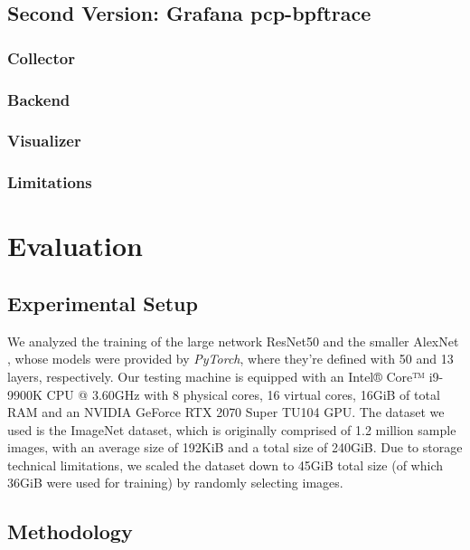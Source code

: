 \documentclass[conference]{IEEEtran}
\begin{document}
\subsection{Second Version: Grafana pcp-bpftrace}

\subsubsection{Collector}

\subsubsection{Backend}

\subsubsection{Visualizer}

\subsubsection{Limitations}

\section{Evaluation}

\subsection{Experimental Setup}

We analyzed the training of the large network ResNet50 \cite{resnet50} and the smaller AlexNet \cite{alexnet}, whose models were
provided by \textit{PyTorch}, where they're defined with 50 and 13 layers, respectively. Our testing machine is equipped with an Intel® Core™ i9-9900K CPU @ 3.60GHz with
8 physical cores, 16 virtual cores, 16GiB of total RAM and an NVIDIA GeForce RTX 2070 Super TU104 GPU. The dataset we used is the ImageNet \cite{imagenet} dataset, which is originally comprised of 1.2 million sample images, with an average size of 192KiB and a total size of 240GiB. Due to storage technical limitations, we scaled the dataset down to 45GiB total size (of which 36GiB were used for training) by randomly selecting images.

\subsection{Methodology}
\end{document}
